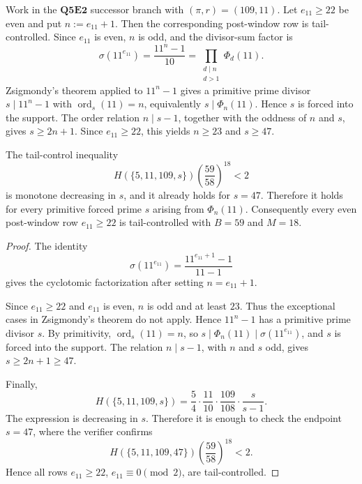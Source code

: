 \begin{criterion}[Parametric post-window closure for \texorpdfstring{\((\pi,r)=(109,11)\)}{(pi,r)=(109,11)}]
\label{crit:q5e2-pi109-r11-parametric-post-window}
Work in the \(\mathbf{Q5E2}\) successor branch with \((\pi,r)=(109,11)\).
Let \(e_{11}\ge22\) be even and put \(n:=e_{11}+1\).  Then the corresponding
post-window row is tail-controlled.  Since \(e_{11}\) is even, \(n\) is odd,
and the divisor-sum factor is
\[
  \sigma(11^{e_{11}})
  =
  \frac{11^n-1}{10}
  =
  \prod_{\substack{d\mid n\\ d>1}}\Phi_d(11).
\]
Zsigmondy's theorem applied to \(11^n-1\) gives a primitive prime divisor
\(s\mid11^n-1\) with \(\operatorname{ord}_s(11)=n\), equivalently
\(s\mid\Phi_n(11)\).  Hence \(s\) is forced into the support.  The order
relation \(n\mid s-1\), together with the oddness of \(n\) and \(s\), gives
\(s\ge2n+1\).  Since \(e_{11}\ge22\), this yields \(n\ge23\) and \(s\ge47\).

The tail-control inequality
\[
  H(\{5,11,109,s\})
  \left(\frac{59}{58}\right)^{18}<2
\]
is monotone decreasing in \(s\), and it already holds for \(s=47\).  Therefore
it holds for every primitive forced prime \(s\) arising from \(\Phi_n(11)\).
Consequently every even post-window row \(e_{11}\ge22\) is tail-controlled with
\(B=59\) and \(M=18\).
\end{criterion}

\begin{proof}
The identity
\[
  \sigma(11^{e_{11}})
  =
  \frac{11^{e_{11}+1}-1}{11-1}
\]
gives the cyclotomic factorization after setting \(n=e_{11}+1\).

Since \(e_{11}\ge22\) and \(e_{11}\) is even, \(n\) is odd and at least \(23\).
Thus the exceptional cases in Zsigmondy's theorem do not apply.  Hence
\(11^n-1\) has a primitive prime divisor \(s\).  By primitivity,
\(\operatorname{ord}_s(11)=n\), so
\(s\mid\Phi_n(11)\mid\sigma(11^{e_{11}})\), and \(s\) is forced into the
support.  The relation \(n\mid s-1\), with \(n\) and \(s\) odd, gives
\(s\ge2n+1\ge47\).

Finally,
\[
  H(\{5,11,109,s\})
  =
  \frac54\cdot\frac{11}{10}\cdot\frac{109}{108}\cdot\frac{s}{s-1}.
\]
The expression is decreasing in \(s\).  Therefore it is enough to check the
endpoint \(s=47\), where the verifier confirms
\[
  H(\{5,11,109,47\})
  \left(\frac{59}{58}\right)^{18}<2.
\]
Hence all rows \(e_{11}\ge22\), \(e_{11}\equiv0\pmod2\), are tail-controlled.
\end{proof}

